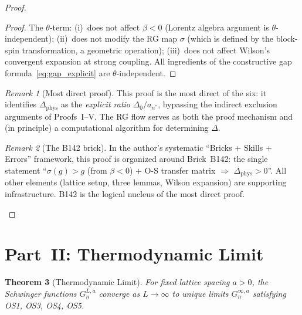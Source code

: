 \documentclass[12pt,a4paper]{article}
\theoremstyle{plain}
\newtheorem{theorem}{Theorem}[section]
\theoremstyle{definition}
\theoremstyle{remark}
\newtheorem{remark}[theorem]{Remark}
\begin{document}
\begin{proof}
\begin{proof}
The $\theta$-term: (i)~does not affect $\beta<0$ (Lorentz algebra argument is $\theta$-independent); (ii)~does not modify the RG map $\sigma$ (which is defined by the block-spin transformation, a geometric operation); (iii)~does not affect Wilson's convergent expansion at strong coupling. All ingredients of the constructive gap formula~\eqref{eq:gap_explicit} are $\theta$-independent.
\end{proof}

\begin{remark}[Most direct proof]\label{rem:direct}
This proof is the most direct of the six: it identifies $\Delta_{\mathrm{phys}}$ as the \emph{explicit ratio} $\Delta_0/a_{n^*}$, bypassing the indirect exclusion arguments of Proofs~I--V. The RG flow serves as both the proof mechanism and (in principle) a computational algorithm for determining $\Delta$.
\end{remark}

\begin{remark}[The B142 brick]\label{rem:B142}
In the author's systematic ``Bricks + Skills + Errors'' framework, this proof is organized around Brick~B142: the single statement ``$\sigma(g)>g$ (from $\beta<0$) $+$ O-S transfer matrix $\Rightarrow$ $\Delta_{\mathrm{phys}}>0$''. All other elements (lattice setup, three lemmas, Wilson expansion) are supporting infrastructure. B142 is the logical nucleus of the most direct proof.
\end{remark}
\end{proof}

\section{Part~II: Thermodynamic Limit}\label{sec:thermo}

\begin{theorem}[Thermodynamic Limit]\label{thm:thermo}
For fixed lattice spacing $a>0$, the Schwinger functions $G_n^{L,a}$ converge as $L\to\infty$ to unique limits $G_n^{\infty,a}$ satisfying OS1, OS3, OS4, OS5.
\end{theorem}
\end{document}
